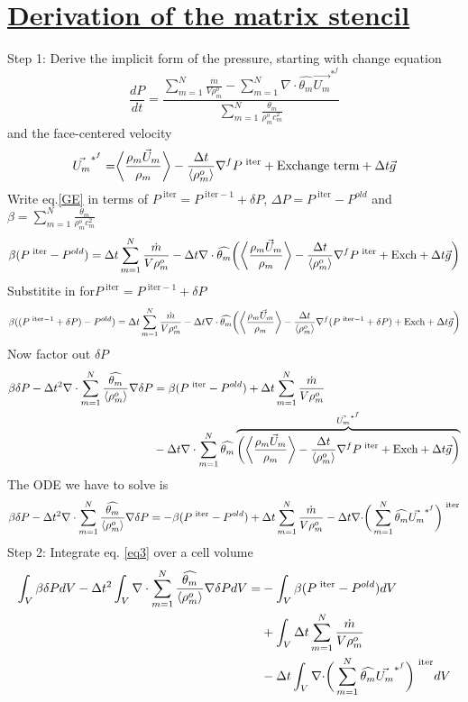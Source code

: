 \documentclass[fleqn]{article}
\newcommand{\SUM}[1]    {\ensuremath{\sum \limits_{{#1}=1}^N }}
\newcommand{\B}[1]      {\biggr{#1}}
\newcommand{\U}         {{\vec{U}}}
\newcommand{\rhoM}      {\ensuremath{\rho^{o}_m}}
\newcommand{\rhoMFC}    {\ensuremath{\langle \rhoM \rangle}}
\newcommand{\delt}      {\ensuremath{\Delta{t}} }
\newcommand{\velFC}     {\ensuremath{\vec{U_m}^{*^{f}} } }
\newcommand{\thetaUW}   {\ensuremath{\widehat{\theta_m}} }
\newcommand{\iter}      {\ensuremath{\text{ iter}}}
\newcommand{\massSrc}   {\ensuremath{ \SUM{m}  \frac{\dot{m}} {V \rhoM} } }
\newcommand{\termA}     {\ensuremath { \B{\langle} \frac{ \rho_m \U_m }{\rho_m} \B{\rangle} } }
\newcommand{\termB}     {\ensuremath{ \frac{ \delt }{\rhoMFC} \nabla^{f} } }
\begin{document}
\section{\underline{Derivation of the matrix stencil \hspace{3in}}}  
Step 1: \hspace{0.25in} Derive the implicit form of the pressure, starting with
change equation
\begin{equation}
     \label{GE}\frac{dP}{dt} = 
     \frac{\massSrc -  \SUM{m} \nabla \cdot \thetaUW \velFC}
                      {\SUM{m} \frac{\theta_m}{\rhoM c_m^2} }
\end{equation}
%
and the face-centered velocity
\[
    \vec{U_m}^{*^{f}} 
    = \termA - \termB{P^{\iter}} + \text{Exchange term}   + \delt\vec{g}
\]
%
Write eq.{\ref{GE}} in terms of $P^{\iter} = P^{\iter -1 } + \delta{P}$, $\Delta{P} = P^{\iter} - P^{old}$ and 
 $\beta = \SUM{m} \frac{\theta_m}{\rhoM c_m^2}$
\begin{equation}
\label{eq2}
\beta (P^{\iter} -P^{old}) =
     \delt \massSrc 
  -  \delt \nabla \cdot \thetaUW \B{(} \termA -\termB{P^{\iter}} +\text{Exch} + \delt\vec{g} \B{)}
\end{equation}
Substitite in for$P^{\iter} = P^{\iter -1 } + \delta{P}$
\[
  \beta ((P^{\iter -1 } + \delta{P}) -P^{old}) =
    \delt \massSrc 
  - \delt \nabla \cdot \thetaUW \B{(} \termA -\termB{(P^{\iter -1 } + \delta{P})} 
  +\text{Exch} + \delt\vec{g} \B{)}
\]
Now factor out $\delta{P}$
\begin{align}
  \beta \delta{P} - 
  \delt^2 \nabla \cdot \SUM{m} \frac{\thetaUW}{\rhoMFC} \nabla \delta{P} \notag
  & = 
     \beta(P^{\iter} - P^{old} ) + \delt \massSrc \notag \\
  &- \delt \nabla \cdot \SUM{m} \thetaUW  \notag
  \overbrace {\B{(} \termA -\termB{P^{\iter}} +\text{Exch} + \delt\vec{g} \B{)} }^{\velFC} \notag
\end{align}
%
%
The ODE we have to solve is
\begin{equation}
\label{eq3}
  \beta \delta{P} - 
  \delt^2 \nabla \cdot \SUM{m} \frac{\thetaUW}{\rhoMFC} \nabla \delta{P}
  =
  -\beta(P^{\iter} - P^{old} )
  + \delt \massSrc
  -  \delt \nabla \cdot \B{(} \SUM{m} \thetaUW \velFC \B{)} ^{\iter}
\end{equation}
%
\newpage
Step 2: \hspace{0.25in} Integrate eq. {\ref{eq3}} over a cell volume
\begin{align}
  \int_{V} \beta \delta{P} dV 
  - \delt^2 \int_{V} \nabla \cdot \SUM{m} \frac{\thetaUW}{\rhoMFC} \nabla \delta{P} dV
  = 
  &- \int_{V} \beta(P^{\iter} - P^{old} ) dV \notag\\
  &+ \int_{V} \delt \massSrc \notag \\
  &- \delt \int_{V} \nabla \cdot \B{(} \SUM{m} \thetaUW \velFC \B{)} ^{\iter} dV \notag
\end{align}
\end{document}
